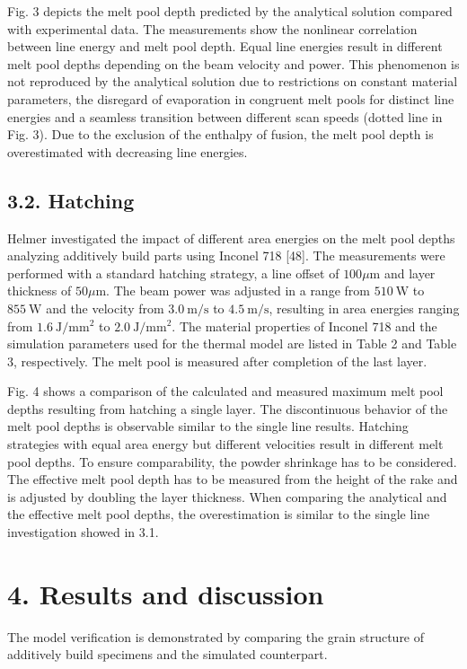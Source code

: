 \documentclass[10pt]{article}
\begin{document}
Fig. 3 depicts the melt pool depth predicted by the analytical solution compared with experimental data. The measurements show the nonlinear correlation between line energy and melt pool depth. Equal line energies result in different melt pool depths depending on the beam velocity and power. This phenomenon is not reproduced by the analytical solution due to restrictions on constant material parameters, the disregard of evaporation in congruent melt pools for distinct line energies and a seamless transition between different scan speeds (dotted line in Fig. 3). Due to the exclusion of the enthalpy of fusion, the melt pool depth is overestimated with decreasing line energies.

\subsection*{3.2. Hatching}
Helmer investigated the impact of different area energies on the melt pool depths analyzing additively build parts using Inconel 718 [48]. The measurements were performed with a standard hatching strategy, a line offset of $100 \mu \mathrm{m}$ and layer thickness of $50 \mu \mathrm{m}$. The beam power was adjusted in a range from $510 \mathrm{~W}$ to $855 \mathrm{~W}$ and the velocity from $3.0 \mathrm{~m} / \mathrm{s}$ to $4.5 \mathrm{~m} / \mathrm{s}$, resulting in area energies ranging from $1.6 \mathrm{~J} / \mathrm{mm}^{2}$ to $2.0 \mathrm{~J} / \mathrm{mm}^{2}$. The material properties of Inconel 718 and the simulation parameters used for the thermal model are listed in Table 2 and Table 3, respectively. The melt pool is measured after completion of the last layer.

Fig. 4 shows a comparison of the calculated and measured maximum melt pool depths resulting from hatching a single layer. The discontinuous behavior of the melt pool depths is observable similar to the single line results. Hatching strategies with equal area energy but different velocities result in different melt pool depths. To ensure comparability, the powder shrinkage has to be considered. The effective melt pool depth has to be measured from the height of the rake and is adjusted by doubling the layer thickness. When comparing the analytical and the effective melt pool depths, the overestimation is similar to the single line investigation showed in 3.1.

\section*{4. Results and discussion}
The model verification is demonstrated by comparing the grain structure of additively build specimens and the simulated counterpart.
\end{document}
